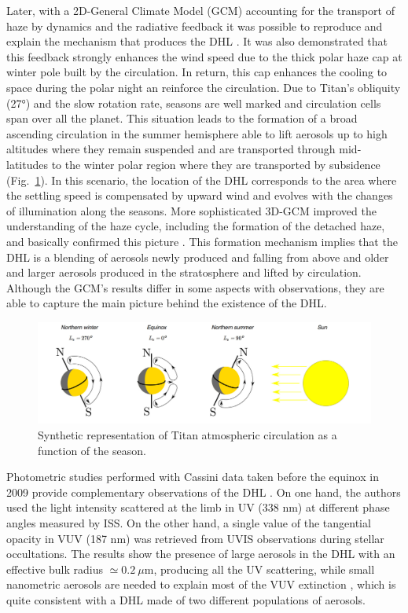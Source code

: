 Later, with a 2D-General Climate Model (GCM) accounting for the transport of haze by dynamics and the radiative
feedback it was possible to reproduce and explain the mechanism that produces the DHL \citep{Rannou2002}. It was also
demonstrated that this feedback strongly enhances the wind speed due to the thick polar haze cap at winter pole built
by the circulation. In return, this cap enhances the cooling to space during the polar night \citep{Rannou2004} an
reinforce the circulation. Due to Titan's obliquity (\ang{27}) and the slow rotation rate, seasons are well
marked and circulation cells span over all the planet. This situation leads to the formation of a
broad ascending circulation in the summer hemisphere able to lift aerosols up to high altitudes where they remain
suspended and are transported through mid-latitudes to the winter polar region where they are transported by
subsidence (Fig.~\ref{fig:titan_atm_circulation}). In this scenario, the location of the DHL corresponds to the area
where the settling speed is compensated by upward wind and evolves with the changes of illumination along the seasons.
More sophisticated 3D-GCM improved the understanding of the haze cycle, including the formation of the detached haze,
and basically confirmed this picture \citep{Lebonnois2012,Larson2015}. This formation mechanism implies that the DHL
is a blending of aerosols newly produced and falling from above and older and larger aerosols produced in the
stratosphere and lifted by circulation.
Although the GCM's results differ in some aspects with observations, they are able to capture the main picture behind
the existence of the DHL.

\begin{figure}[!ht]
    \centering
    \includegraphics[width=\textwidth]{Fig/Atmsopheric_circulation.jpg}  %
    \caption{Synthetic representation of Titan atmospheric circulation as a function of the season.}
    \label{fig:titan_atm_circulation}
\end{figure}

Photometric studies performed with Cassini data taken before the equinox in 2009 provide complementary observations
of the DHL \citep{Cours2011, Koskinen2011, Seignovert2017}.
On one hand, the authors used the light intensity scattered at the limb in UV (338 nm)
at different phase angles measured by ISS. On the other hand, a single value of the tangential opacity in VUV (187 nm)
was retrieved from UVIS observations during stellar occultations.
The results show the presence of large aerosols in the DHL with an effective bulk radius $\simeq 0.2\ \mu$m,
producing all the UV scattering, while small nanometric aerosols are needed to explain most of the VUV
extinction \citep{Cours2011}, which is quite consistent with a DHL made of two different populations of
aerosols.

